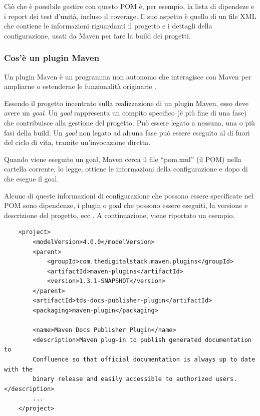 
    Ciò che è possibile gestire con questo POM è, per esempio, la lista di dipendeze e i report dei test d'unità, incluso il coverage.
    Il suo aspetto è quello di un file XML che contiene le informazioni riguardanti il progetto e i dettagli della configurazione, usati da Maven per fare la build dei progetti.

    \subsubsection{Cos'è un plugin Maven}

    Un plugin Maven è un programma non autonomo che interagisce con Maven per ampliarne o estenderne le funzionalità originarie \cite{site:maven-plugin}.

    Essendo il progetto incentrato sulla realizzazione di un plugin Maven, esso deve avere un \emph{goal}.
    Un \emph{goal} rappresenta un compito specifico (è più fine di una fase) che contribuisce alla gestione del progetto.
    Può essere legato a nessuna, una o più fasi della build.
    Un \emph{goal} non legato ad alcuna fase può essere eseguito al di fuori del ciclo di vita, tramite un'invocazione diretta.


    Quando viene eseguito un goal, Maven cerca il file ``pom.xml'' (il POM) nella cartella corrente, lo legge, ottiene le informazioni della configurazione e dopo di che esegue il goal.

    Alcune di queste informazioni di configurazione che possono essere specificate nel POM sono dipendenze, i plugin o goal che possono essere eseguiti, la versione e descrizione del progetto, ecc \cite{site:maven-pom}.
    A continuazione, viene riportato un esempio.


    \begin{lstlisting} 
    <project>
        <modelVersion>4.0.0</modelVersion>
        <parent>
            <groupId>com.thedigitalstack.maven.plugins</groupId>
            <artifactId>maven-plugins</artifactId>
            <version>1.3.1-SNAPSHOT</version>
        </parent>
        <artifactId>tds-docs-publisher-plugin</artifactId>
        <packaging>maven-plugin</packaging>

        <name>Maven Docs Publisher Plugin</name>
        <description>Maven plug-in to publish generated documentation to 
        Confluence so that official documentation is always up to date with the 
        binary release and easily accessible to authorized users.</description>
        ...
    </project>  
    \end{lstlisting}
    

